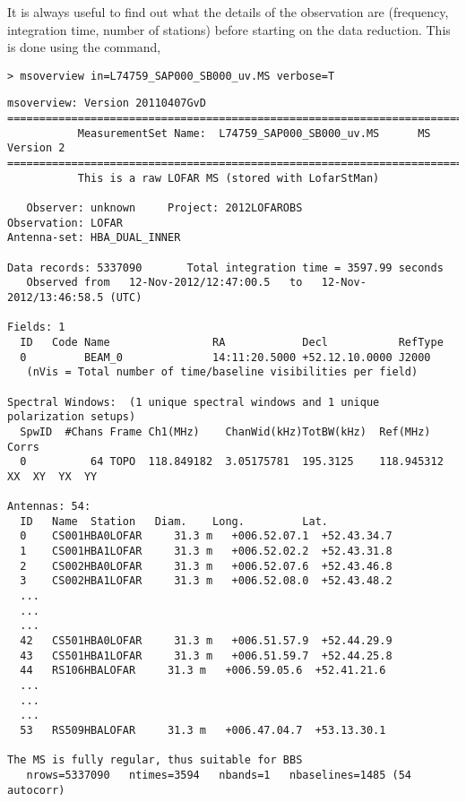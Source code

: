  It is always useful to find out what the details of the observation are (frequency, integration time, number of stations) before starting on the data reduction. This is done using the command,
\begin{verbatim}
> msoverview in=L74759_SAP000_SB000_uv.MS verbose=T
\end{verbatim}
\begin{lstlisting}
msoverview: Version 20110407GvD
================================================================================
           MeasurementSet Name:  L74759_SAP000_SB000_uv.MS      MS Version 2
================================================================================
           This is a raw LOFAR MS (stored with LofarStMan)

   Observer: unknown     Project: 2012LOFAROBS  
Observation: LOFAR
Antenna-set: HBA_DUAL_INNER

Data records: 5337090       Total integration time = 3597.99 seconds
   Observed from   12-Nov-2012/12:47:00.5   to   12-Nov-2012/13:46:58.5 (UTC)

Fields: 1
  ID   Code Name                RA            Decl           RefType 
  0         BEAM_0              14:11:20.5000 +52.12.10.0000 J2000   
   (nVis = Total number of time/baseline visibilities per field) 

Spectral Windows:  (1 unique spectral windows and 1 unique polarization setups)
  SpwID  #Chans Frame Ch1(MHz)    ChanWid(kHz)TotBW(kHz)  Ref(MHz)    Corrs           
  0          64 TOPO  118.849182  3.05175781  195.3125    118.945312  XX  XY  YX  YY  

Antennas: 54:
  ID   Name  Station   Diam.    Long.         Lat.         
  0    CS001HBA0LOFAR     31.3 m   +006.52.07.1  +52.43.34.7  
  1    CS001HBA1LOFAR     31.3 m   +006.52.02.2  +52.43.31.8  
  2    CS002HBA0LOFAR     31.3 m   +006.52.07.6  +52.43.46.8  
  3    CS002HBA1LOFAR     31.3 m   +006.52.08.0  +52.43.48.2 
  ...
  ...
  ...
  42   CS501HBA0LOFAR     31.3 m   +006.51.57.9  +52.44.29.9  
  43   CS501HBA1LOFAR     31.3 m   +006.51.59.7  +52.44.25.8  
  44   RS106HBALOFAR     31.3 m   +006.59.05.6  +52.41.21.6  
  ...
  ...
  ...
  53   RS509HBALOFAR     31.3 m   +006.47.04.7  +53.13.30.1  

The MS is fully regular, thus suitable for BBS
   nrows=5337090   ntimes=3594   nbands=1   nbaselines=1485 (54 autocorr)
\end{lstlisting}
% 
